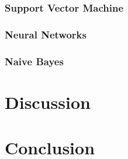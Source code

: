 \documentclass[11pt]{article}
\begin{document}
\subsubsection{Support Vector Machine}

\subsubsection{Neural Networks}

\subsubsection{Naive Bayes}

\section{Discussion}

\section{Conclusion}




\end{document}
